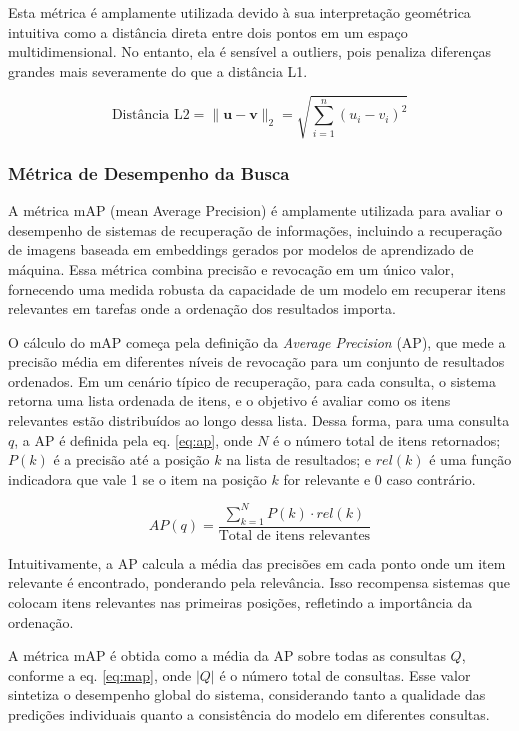 Esta métrica é amplamente utilizada devido à sua interpretação geométrica intuitiva como a distância direta entre dois pontos em um espaço multidimensional. No entanto, ela é sensível a outliers, pois penaliza diferenças grandes mais severamente do que a distância L1.

\begin{equation}\label{eq:l2}
  \text{Distância L2} = \|\mathbf{u} - \mathbf{v}\|_2 = \sqrt{\sum_{i=1}^n (u_i - v_i)^2}
\end{equation}




\subsubsection{Métrica de Desempenho da Busca}
\label{sec:metricas-map}
A métrica mAP (mean Average Precision) é amplamente utilizada para avaliar o desempenho de sistemas de recuperação de informações, incluindo a recuperação de imagens baseada em embeddings gerados por modelos de aprendizado de máquina. Essa métrica combina precisão e revocação em um único valor, fornecendo uma medida robusta da capacidade de um modelo em recuperar itens relevantes em tarefas onde a ordenação dos resultados importa.

O cálculo do mAP começa pela definição da \emph{Average Precision} (AP), que mede a precisão média em diferentes níveis de revocação para um conjunto de resultados ordenados. Em um cenário típico de recuperação, para cada consulta, o sistema retorna uma lista ordenada de itens, e o objetivo é avaliar como os itens relevantes estão distribuídos ao longo dessa lista. Dessa forma, para uma consulta \( q \), a AP é definida pela eq. \eqref{eq:ap}, onde \( N \) é o número total de itens retornados; \( P(k) \) é a precisão até a posição \( k \) na lista de resultados; e \( rel(k) \) é uma função indicadora que vale 1 se o item na posição \( k \) for relevante e 0 caso contrário.

\begin{equation}\label{eq:ap}
  AP(q) = \frac{\sum_{k=1}^N P(k) \cdot rel(k)}{\text{Total de itens relevantes}}
\end{equation}

Intuitivamente, a AP calcula a média das precisões em cada ponto onde um item relevante é encontrado, ponderando pela relevância. Isso recompensa sistemas que colocam itens relevantes nas primeiras posições, refletindo a importância da ordenação.

A métrica mAP é obtida como a média da AP sobre todas as consultas \( Q \), conforme a eq. \eqref{eq:map}, onde \( |Q| \) é o número total de consultas. Esse valor sintetiza o desempenho global do sistema, considerando tanto a qualidade das predições individuais quanto a consistência do modelo em diferentes consultas.

